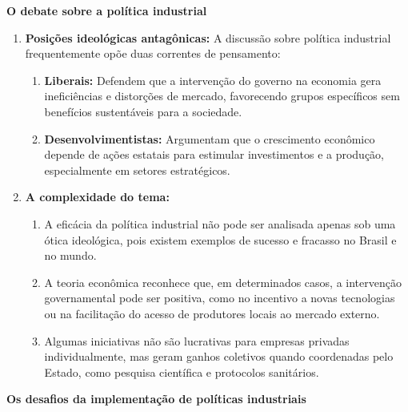 \documentclass[a4paper,12pt]{article}[abntex2]
\begin{document}
\textbf{O debate sobre a política industrial}

\begin{enumerate}
    \item \textbf{Posições ideológicas antagônicas:}  
    A discussão sobre política industrial frequentemente opõe duas correntes de pensamento:
    \begin{enumerate}
        \item \textbf{Liberais:}  
        Defendem que a intervenção do governo na economia gera ineficiências e distorções de mercado, favorecendo grupos específicos sem benefícios sustentáveis para a sociedade.
        \item \textbf{Desenvolvimentistas:}  
        Argumentam que o crescimento econômico depende de ações estatais para estimular investimentos e a produção, especialmente em setores estratégicos.
    \end{enumerate}

    \item \textbf{A complexidade do tema:}  
    \begin{enumerate}
        \item A eficácia da política industrial não pode ser analisada apenas sob uma ótica ideológica, pois existem exemplos de sucesso e fracasso no Brasil e no mundo.
        \item A teoria econômica reconhece que, em determinados casos, a intervenção governamental pode ser positiva, como no incentivo a novas tecnologias ou na facilitação do acesso de produtores locais ao mercado externo.
        \item Algumas iniciativas não são lucrativas para empresas privadas individualmente, mas geram ganhos coletivos quando coordenadas pelo Estado, como pesquisa científica e protocolos sanitários.
    \end{enumerate}
\end{enumerate}

\textbf{Os desafios da implementação de políticas industriais}
\end{document}
